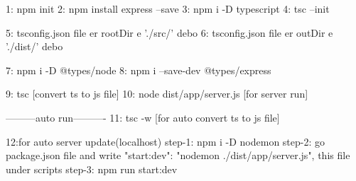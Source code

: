 1: npm init
2: npm install express --save
3: npm i -D typescript
4: tsc --init

5: tsconfig.json file er
rootDir e './src/' debo
6: tsconfig.json file er
outDir e './dist/' debo

7: npm i -D @types/node
8: npm i --save-dev @types/express

9: tsc [convert ts to js file]
10: node dist/app/server.js [for server run]

---------auto run----------
11: tsc -w [for auto convert ts to js file]

12:for auto server update(localhost)
step-1: npm i -D nodemon
step-2: go package.json file and write "start:dev": "nodemon ./dist/app/server.js", this file under scripts
step-3: npm run start:dev
